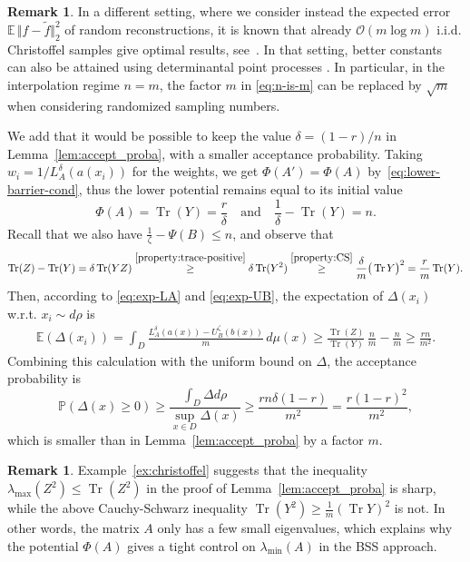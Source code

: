 \documentclass[a4paper,11pt]{article}
\renewcommand{\(}{\left (}
\renewcommand{\)}{\right )}
\newcommand{\<}{\langle}
\renewcommand{\>}{\rangle}
\newcommand{\E}{\mathbb{E}}
\theoremstyle{definition}
\newtheorem{remark}[theorem]{Remark}
\DeclareMathOperator{\Tr}{Tr}
\begin{document}
\begin{remark}
    In a different setting,
    where we consider instead the expected error $\mathbb E\,\Vert f -\tilde f \Vert_2^2$
    of random reconstructions,
    it is known that already $\mathcal{O}(m\log m)$ i.i.d. Christoffel samples
    give optimal results, see~\cite{CM}.
    In that setting, better constants can also be attained using determinantal point processes \cite{BBC}.
    In particular, in the interpolation regime $n=m$, the factor $m$ in \eqref{eq:n-is-m} can be replaced by $\sqrt{m}$ when considering randomized sampling numbers.
\end{remark}


We add that it would be 
possible to keep the value $\delta=(1-r)/n$ in Lemma~\ref{lem:accept_proba}, with a smaller acceptance probability.
Taking $w_i=1/L_A^\delta(a(x_i))$ for the weights, we get $\Phi(A')=\Phi(A)$ by~\eqref{eq:lower-barrier-cond}, thus the lower potential remains equal to its initial value 
\[
\Phi(A)=\Tr(Y)=\frac{r}{\delta}\quad\text{and}\quad\frac{1}{\delta}-\Tr(Y)=n.
\]
Recall that we also have $\frac{1}{\zeta}-\Psi(B)\leq n$, and observe that
\[
\Tr(Z)-\Tr(Y)=\delta\Tr(YZ)
\overset{\eqref{property:trace-positive}}{\geq}
\delta\Tr(Y^2)
\overset{\eqref{property:CS} }{\geq}
\frac{\delta}{m}\big(\Tr Y\big)^2
=\frac{r}{m}\Tr(Y).
\]
Then, according to \eqref{eq:exp-LA} and \eqref{eq:exp-UB}, 
the expectation of $\Delta(x_i)$ w.r.t. $x_i\sim d\rho$ is
\begin{align*}
\E(\Delta(x_i))
=\int_D \frac{L_A^\delta(a(x))-U_B^\zeta(b(x))}m \, d\mu(x)
\geq \frac{\Tr(Z)}{\Tr(Y)}\,\frac nm - \frac nm
\geq \frac{rn}{m^2}.
\end{align*}
Combining this calculation with the uniform bound on $\Delta$, the acceptance probability is
\[
\mathbb P(\Delta(x)\geq 0)\geq \frac{\int_D \Delta d\rho}{\sup_{x\in D} \Delta(x)}\geq \frac{rn\delta(1-r)}{m^2}=\frac{r(1-r)^2}{m^2},
\]
which is smaller than in Lemma~\ref{lem:accept_proba} by a factor $m$.

\begin{remark}
Example~\ref{ex:christoffel} suggests that the inequality $\lambda_{\max}(Z^2)\leq \Tr(Z^2)$ in the proof of Lemma~\ref{lem:accept_proba} is sharp, while the above Cauchy-Schwarz inequality $\Tr(Y^2)\geq \frac 1 m (\Tr Y)^2$ is not. 
In other words, the matrix $A$ only has a few small eigenvalues, which explains why the potential $\Phi(A)$ gives a tight control on $\lambda_{\min}(A)$ in the BSS approach.
\end{remark}
\end{document}
